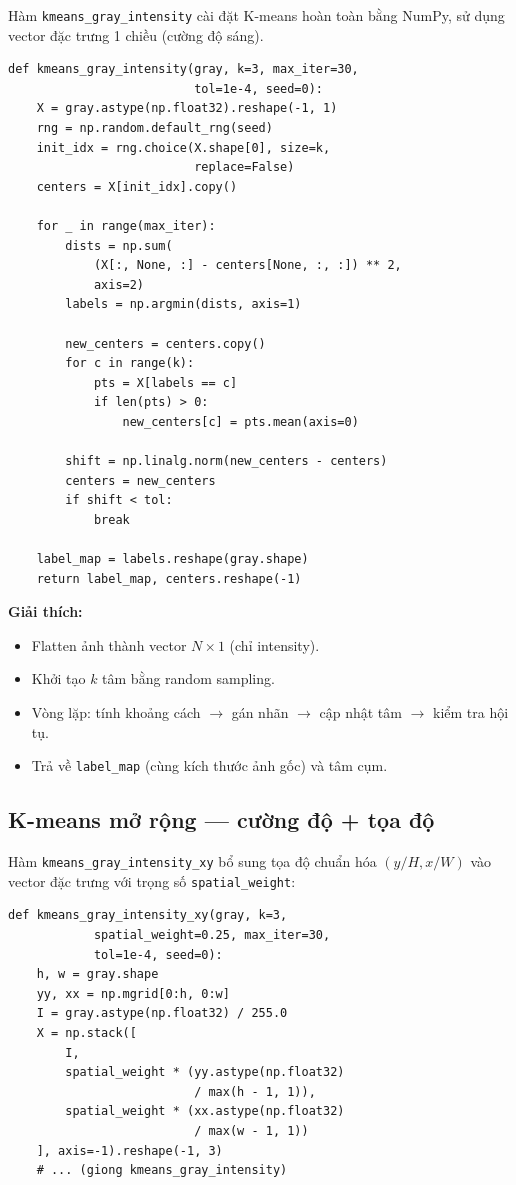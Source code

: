 \documentclass[12pt,a4paper]{article}
\begin{document}
Hàm \texttt{kmeans\_gray\_intensity} cài đặt K-means hoàn toàn bằng NumPy, sử dụng vector đặc trưng 1 chiều (cường độ sáng).

\begin{lstlisting}
def kmeans_gray_intensity(gray, k=3, max_iter=30,
                          tol=1e-4, seed=0):
    X = gray.astype(np.float32).reshape(-1, 1)
    rng = np.random.default_rng(seed)
    init_idx = rng.choice(X.shape[0], size=k,
                          replace=False)
    centers = X[init_idx].copy()

    for _ in range(max_iter):
        dists = np.sum(
            (X[:, None, :] - centers[None, :, :]) ** 2,
            axis=2)
        labels = np.argmin(dists, axis=1)

        new_centers = centers.copy()
        for c in range(k):
            pts = X[labels == c]
            if len(pts) > 0:
                new_centers[c] = pts.mean(axis=0)

        shift = np.linalg.norm(new_centers - centers)
        centers = new_centers
        if shift < tol:
            break

    label_map = labels.reshape(gray.shape)
    return label_map, centers.reshape(-1)
\end{lstlisting}

\textbf{Giải thích:}
\begin{itemize}
    \item Flatten ảnh thành vector $N \times 1$ (chỉ intensity).
    \item Khởi tạo $k$ tâm bằng random sampling.
    \item Vòng lặp: tính khoảng cách $\to$ gán nhãn $\to$ cập nhật tâm $\to$ kiểm tra hội tụ.
    \item Trả về \texttt{label\_map} (cùng kích thước ảnh gốc) và tâm cụm.
\end{itemize}

\subsection{K-means mở rộng --- cường độ + tọa độ}

Hàm \texttt{kmeans\_gray\_intensity\_xy} bổ sung tọa độ chuẩn hóa $(y/H, x/W)$ vào vector đặc trưng với trọng số \texttt{spatial\_weight}:

\begin{lstlisting}
def kmeans_gray_intensity_xy(gray, k=3,
            spatial_weight=0.25, max_iter=30,
            tol=1e-4, seed=0):
    h, w = gray.shape
    yy, xx = np.mgrid[0:h, 0:w]
    I = gray.astype(np.float32) / 255.0
    X = np.stack([
        I,
        spatial_weight * (yy.astype(np.float32)
                          / max(h - 1, 1)),
        spatial_weight * (xx.astype(np.float32)
                          / max(w - 1, 1))
    ], axis=-1).reshape(-1, 3)
    # ... (giong kmeans_gray_intensity)
\end{lstlisting}
\end{document}
